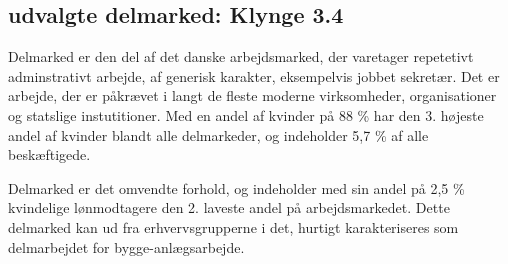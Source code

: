 








%
\subsection{udvalgte delmarked: Klynge 3.4}
%

Delmarked  er den del af det danske arbejdsmarked, der varetager repetetivt adminstrativt arbejde, af generisk karakter, eksempelvis jobbet sekretær. Det er arbejde, der er påkrævet i langt de fleste moderne virksomheder, organisationer og statslige instutitioner. Med en andel af kvinder på 88 \% har  den  3. højeste andel af kvinder blandt alle delmarkeder, og indeholder 5,7 \% af alle beskæftigede. 

Delmarked  er det omvendte forhold, og indeholder med sin andel på 2,5 \% kvindelige lønmodtagere den 2. laveste andel på arbejdsmarkedet. Dette delmarked kan ud fra erhvervsgrupperne i det, hurtigt karakteriseres som delmarbejdet for bygge-anlægsarbejde. %

